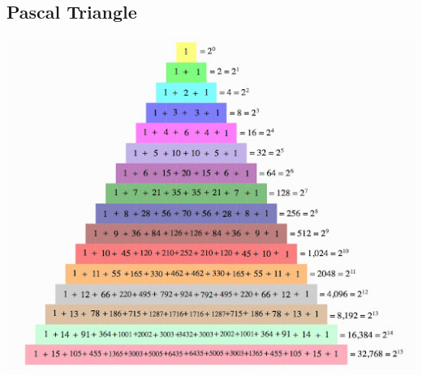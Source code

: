 \subsection{Pascal Triangle}

\begin{center}
    \includegraphics[scale=.6, keepaspectratio]{./theoretical/assets/pascal_triangle.png}
\end{center}
